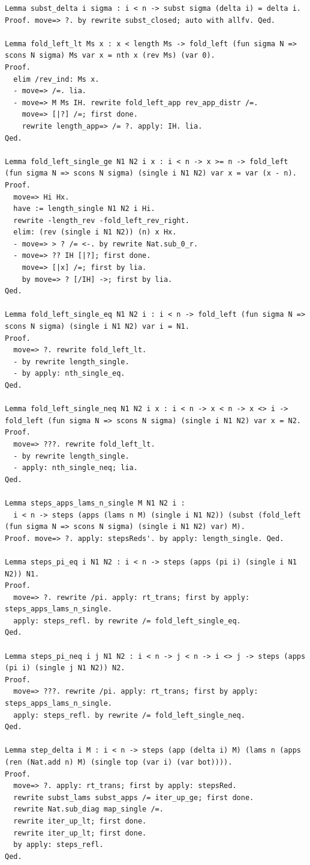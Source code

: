 \documentclass[10pt,a4paper]{amsart}
\begin{document}
\begin{lstlisting}
Lemma subst_delta i sigma : i < n -> subst sigma (delta i) = delta i.
Proof. move=> ?. by rewrite subst_closed; auto with allfv. Qed.

Lemma fold_left_lt Ms x : x < length Ms -> fold_left (fun sigma N => scons N sigma) Ms var x = nth x (rev Ms) (var 0).
Proof.
  elim /rev_ind: Ms x.
  - move=> /=. lia.
  - move=> M Ms IH. rewrite fold_left_app rev_app_distr /=.
    move=> [|?] /=; first done.
    rewrite length_app=> /= ?. apply: IH. lia.
Qed.

Lemma fold_left_single_ge N1 N2 i x : i < n -> x >= n -> fold_left (fun sigma N => scons N sigma) (single i N1 N2) var x = var (x - n).
Proof.
  move=> Hi Hx.
  have := length_single N1 N2 i Hi.
  rewrite -length_rev -fold_left_rev_right.
  elim: (rev (single i N1 N2)) (n) x Hx.
  - move=> > ? /= <-. by rewrite Nat.sub_0_r.
  - move=> ?? IH [|?]; first done.
    move=> [|x] /=; first by lia.
    by move=> ? [/IH] ->; first by lia.
Qed.

Lemma fold_left_single_eq N1 N2 i : i < n -> fold_left (fun sigma N => scons N sigma) (single i N1 N2) var i = N1.
Proof.
  move=> ?. rewrite fold_left_lt.
  - by rewrite length_single.
  - by apply: nth_single_eq.
Qed.

Lemma fold_left_single_neq N1 N2 i x : i < n -> x < n -> x <> i -> fold_left (fun sigma N => scons N sigma) (single i N1 N2) var x = N2.
Proof.
  move=> ???. rewrite fold_left_lt.
  - by rewrite length_single.
  - apply: nth_single_neq; lia.
Qed.

Lemma steps_apps_lams_n_single M N1 N2 i :
  i < n -> steps (apps (lams n M) (single i N1 N2)) (subst (fold_left (fun sigma N => scons N sigma) (single i N1 N2) var) M).
Proof. move=> ?. apply: stepsReds'. by apply: length_single. Qed.

Lemma steps_pi_eq i N1 N2 : i < n -> steps (apps (pi i) (single i N1 N2)) N1.
Proof.
  move=> ?. rewrite /pi. apply: rt_trans; first by apply: steps_apps_lams_n_single.
  apply: steps_refl. by rewrite /= fold_left_single_eq.
Qed.

Lemma steps_pi_neq i j N1 N2 : i < n -> j < n -> i <> j -> steps (apps (pi i) (single j N1 N2)) N2.
Proof.
  move=> ???. rewrite /pi. apply: rt_trans; first by apply: steps_apps_lams_n_single.
  apply: steps_refl. by rewrite /= fold_left_single_neq.
Qed.

Lemma step_delta i M : i < n -> steps (app (delta i) M) (lams n (apps (ren (Nat.add n) M) (single top (var i) (var bot)))).
Proof.
  move=> ?. apply: rt_trans; first by apply: stepsRed.
  rewrite subst_lams subst_apps /= iter_up_ge; first done.
  rewrite Nat.sub_diag map_single /=.
  rewrite iter_up_lt; first done.
  rewrite iter_up_lt; first done.
  by apply: steps_refl.
Qed.


\end{lstlisting}
\end{document}
